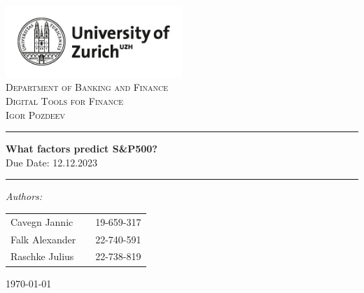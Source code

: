 \begin{titlepage}
\vbox{ }
\vbox{ }
\begin{center}
\includegraphics[width = 0.5\textwidth]{images/UZH_logo.png}\\
\vspace{0.5cm}
\textsc{\LARGE Department of Banking and Finance}\\
\vspace{1.5cm}
\textsc{\Large Digital Tools for Finance}\\
\vspace{0.2cm}
\textsc{\Large Igor Pozdeev}\\
\vspace{0.5cm}
\vbox{ }

\hrule
\vspace{0.4cm}
{ \huge \bfseries What factors predict S\&P500?}\\
{Due Date: 12.12.2023}
\vspace{0.4cm}
\hrule
\vspace{1.5cm}

\large
\emph{Authors:}\\
    \begin{table}[hb]
        \centering
        \begin{tabular}{lll}
            Cavegn Jannic   && 19-659-317 \\
            Falk Alexander && 22-740-591 \\
            Raschke Julius    && 22-738-819 \\
            \end{tabular}
    \end{table}
\vfill

{\large \today}
\end{center}
\end{titlepage}
